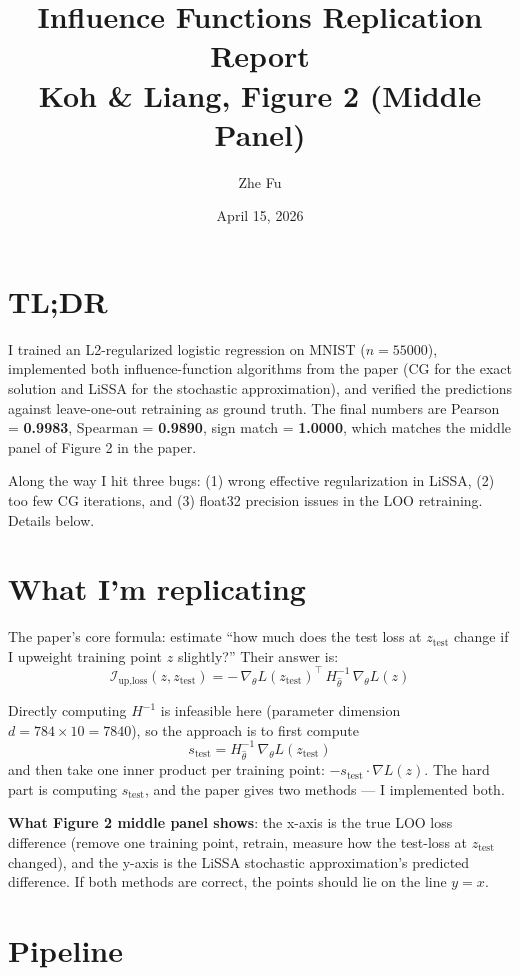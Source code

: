 \documentclass[a4paper,11pt]{article}
\title{Influence Functions Replication Report \\ \large Koh \& Liang, Figure 2 (Middle Panel)}
\author{Zhe Fu}
\date{April 15, 2026}
\begin{document}
\maketitle

\section*{TL;DR}

I trained an L2-regularized logistic regression on MNIST ($n=55000$),
implemented both influence-function algorithms from the paper
(CG for the exact solution and LiSSA for the stochastic approximation),
and verified the predictions against leave-one-out retraining as ground truth.
The final numbers are Pearson = \textbf{0.9983}, Spearman = \textbf{0.9890},
sign match = \textbf{1.0000}, which matches the middle panel of Figure 2 in the paper.

Along the way I hit three bugs: (1) wrong effective regularization in LiSSA,
(2) too few CG iterations, and (3) float32 precision issues in the LOO retraining.
Details below.

\section{What I'm replicating}

The paper's core formula: estimate ``how much does the test loss at $z_{\text{test}}$
change if I upweight training point $z$ slightly?''
Their answer is:
\[
\mathcal{I}_{\text{up,loss}}(z, z_{\text{test}})
  = -\, \nabla_\theta L(z_{\text{test}})^\top \, H_{\hat\theta}^{-1} \, \nabla_\theta L(z)
\]

Directly computing $H^{-1}$ is infeasible here (parameter dimension
$d = 784 \times 10 = 7840$), so the approach is to first compute
\[
s_{\text{test}} = H_{\hat\theta}^{-1} \, \nabla_\theta L(z_{\text{test}})
\]
and then take one inner product per training point: $-s_{\text{test}} \cdot \nabla L(z)$.
The hard part is computing $s_{\text{test}}$, and the paper gives two methods --- I implemented both.

\textbf{What Figure 2 middle panel shows}: the x-axis is the true LOO loss difference
(remove one training point, retrain, measure how the test-loss at $z_{\text{test}}$ changed),
and the y-axis is the LiSSA stochastic approximation's predicted difference.
If both methods are correct, the points should lie on the line $y = x$.

\section{Pipeline}
\end{document}
